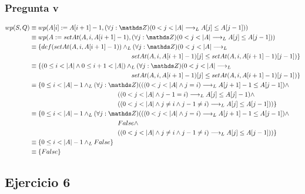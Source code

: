 \subsubsection{Pregunta v}
\begin{align*}
    wp(S, Q) &\equiv wp(A[i] := A[i+1] - 1, (\forall j: \ent)(0 < j < |A| \implicaLuego A[j] \leq A[j-1])) \\
    &\equiv wp(A := setAt(A, i, A[i+1] - 1), (\forall j: \ent)(0 < j < |A| \implicaLuego A[j] \leq A[j-1])) \\
    &\equiv \{ def(setAt(A, i, A[i+1] - 1)) \yLuego (\forall j: \ent)(0 < j < |A| \implicaLuego \\
    &\qquad \qquad \qquad \qquad \qquad \qquad \qquad \qquad setAt(A, i, A[i+1] - 1)[j] \leq setAt(A, i, A[i+1] - 1)[j-1]) \} \\
    &\equiv \{ (0 \leq i < |A| \wedge 0 \leq i+1 < |A|) \yLuego (\forall j: \ent)(0 < j < |A| \implicaLuego \\
    &\qquad \qquad \qquad \qquad \qquad \qquad \qquad \qquad setAt(A, i, A[i+1] - 1)[j] \leq setAt(A, i, A[i+1] - 1)[j-1]) \} \\
    &\equiv \{ 0 \leq i < |A|-1 \yLuego (\forall j: \ent)(((0 < j < |A| \wedge j = i) \implicaLuego A[j+1] - 1 \leq A[j-1]) \wedge \\
    &\qquad \qquad \qquad \qquad \qquad \qquad \quad \; \; \; ((0 < j < |A| \wedge j-1 = i) \implicaLuego A[j] \leq A[j] - 1) \wedge \\ 
    &\qquad \qquad \qquad \qquad \qquad \qquad \quad \; \; \; ((0 < j < |A| \wedge j \neq i \wedge j-1 \neq i) \implicaLuego A[j] \leq A[j-1])) \} \\
    &\equiv \{ 0 \leq i < |A|-1 \yLuego (\forall j: \ent)(((0 < j < |A| \wedge j = i) \implicaLuego A[j+1] - 1 \leq A[j-1]) \wedge \\
    &\qquad \qquad \qquad \qquad \qquad \qquad \quad \; \; \; False \wedge \\ 
    &\qquad \qquad \qquad \qquad \qquad \qquad \quad \; \; \; ((0 < j < |A| \wedge j \neq i \wedge j-1 \neq i) \implicaLuego A[j] \leq A[j-1])) \} \\
    &\equiv \{ 0 \leq i < |A|-1 \yLuego False \} \\
    &\equiv \{ False \} \\
\end{align*}

\subsection{Ejercicio 6}
